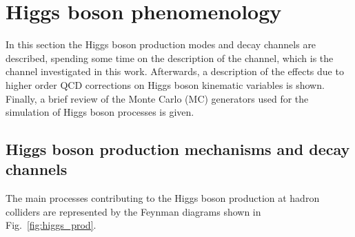 \section{Higgs boson phenomenology}
\label{sec:HiggsPheno}

In this section the Higgs boson production modes and decay channels are described, spending some time on the description of the \hww channel, which is the channel investigated in this work. Afterwards, a description of the effects due to higher order QCD corrections on Higgs boson kinematic variables is shown. Finally, a brief review of the Monte Carlo (MC) generators used for the simulation of Higgs boson processes is given.





\subsection{Higgs boson production mechanisms and decay channels}

The main processes contributing to the Higgs boson production at hadron colliders are represented by the Feynman diagrams shown in Fig.~\ref{fig:higgs_prod}.

